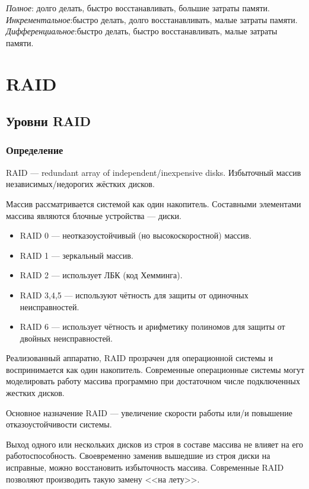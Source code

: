 \emph{Полное}: долго делать, быстро восстанавливать, большие затраты памяти.
\emph{Инкрементальное}:быстро делать, долго восстанавливать, малые затраты памяти.
\emph{Дифференциальное}:быстро делать, быстро восстанавливать, малые затраты памяти.


\section{RAID}


\subsection{Уровни RAID}


\begin{frame}
    \frametitle{Определение}
    
    \begin{definition}%
        \alert{RAID} --- redundant array of independent/inexpensive disks. Избыточный массив независимых/недорогих жёстких дисков.
    \end{definition}
    
    Массив рассматривается системой как один накопитель. Составными элементами массива являются \alert{блочные} устройства --- диски.
    \begin{itemize}
        \item RAID 0 --- неотказоустойчивый (но высокоскоростной) массив.
        \item RAID 1 --- зеркальный массив.
        \item RAID 2 --- использует ЛБК (код Хемминга).
        \item RAID 3,4,5 --- используют чётность для защиты от одиночных неисправностей.
        \item RAID 6 --- использует чётность и арифметику полиномов для защиты от двойных неисправностей.
    \end{itemize}
\end{frame}

Реализованный аппаратно, RAID прозрачен для операционной системы и воспринимается как один накопитель. Современные операционные  системы могут моделировать работу массива программно при достаточном числе подключенных жестких дисков.

Основное назначение RAID --- увеличение скорости работы или/и повышение отказоустойчивости системы.

Выход одного или нескольких дисков из строя в составе массива не влияет на его работоспособность. Своевременно заменив вышедшие из строя диски на исправные, можно восстановить избыточность массива. Современные RAID позволяют производить такую замену <<на лету>>.

